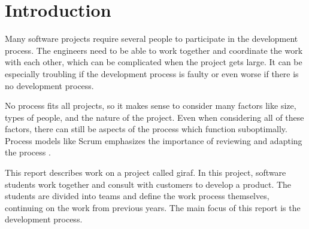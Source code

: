 \section{Introduction}

Many software projects require several people to participate in the development process. The engineers need to be able to work together and coordinate the work with each other, which can be complicated when the project gets large. It can be especially troubling if the development process is faulty or even worse if there is no development process.

No process fits all projects, so it makes sense to consider many factors like size, types of people, and the nature of the project. Even when considering all of these factors, there can still be aspects of the process which function suboptimally. Process models like \gls{Scrum} emphasizes the importance of reviewing and adapting the process \cite{Scrum}.

This report describes work on a project called \gls{giraf}. In this project, software students work together and consult with customers to develop a product. The students are divided into teams and define the work process themselves, continuing on the work from previous years. The main focus of this report is the development process.